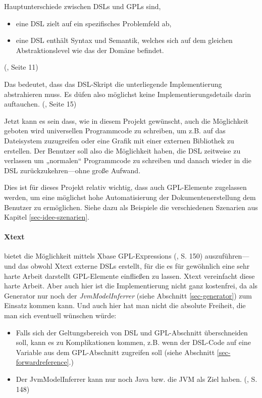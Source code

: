 Hauptunterschiede zwischen DSLs und GPLs sind,

\begin{itemize}
  \item eine DSL zielt auf ein spezifisches Problemfeld ab,
  \item eine DSL enthält Syntax und Semantik, welches sich auf dem gleichen
        Abstraktionslevel wie das der Domäne befindet.
\end{itemize}

(\cite{dsls}, Seite 11)

Das bedeutet, dass das DSL-Skript die unterliegende Implementierung abstrahieren
muss. Es düfen also möglichst keine Implementierungsdetails darin auftauchen.
(\cite{dsls}, Seite 15)

Jetzt kann es sein dass, wie in diesem Projekt gewünscht,
auch die Möglichkeit geboten wird universellen Programmcode zu schreiben,
um z.B. auf das Dateisystem zuzugreifen oder eine Grafik mit einer
externen Bibliothek zu erstellen. Der Benutzer soll also die
Möglichkeit haben, die DSL zeitweise zu verlassen um „normalen“ Programmcode
zu schreiben und danach wieder in die DSL zurückzukehren---ohne große
Aufwand.

Dies ist für dieses Projekt relativ wichtig, dass auch GPL-Elemente zugelassen
werden, um eine möglichst hohe Automatisierung der Dokumentenerstellung
dem Benutzer zu ermöglichen. Siehe dazu als Beispiele
die verschiedenen Szenarien aus Kapitel \ref{sec-idee-szenarien}.

\paragraph{Xtext} bietet die Möglichkeit mittels Xbase GPL-Expressions
(\cite{xtext}, S. 150)
auszuführen---und das obwohl Xtext externe DSLs erstellt, für die es für
gewöhnlich eine sehr harte Arbeit darstellt GPL-Elemente einfließen zu lassen.
Xtext vereinfacht diese harte Arbeit. Aber auch hier ist die Implementierung
nicht ganz kostenfrei, da als Generator nur noch der \emph{JvmModelInferrer}
(siehe Abschnitt \ref{sec-generator}) zum Einsatz kommen kann.
Und auch hier hat man nicht die absolute Freiheit, die man sich eventuell
wünschen würde:

\begin{itemize}
  \item Falls sich der Geltungsbereich von DSL und GPL-Abschnitt überschneiden
        soll, kann es zu Komplikationen kommen, z.B. wenn der DSL-Code
        auf eine Variable aus dem GPL-Abschnitt zugreifen soll (siehe
        Abschnitt \ref{sec-forwardreference}.)
  \item Der JvmModelInferrer kann nur noch Java bzw. die JVM als Ziel haben.
        (\cite{xtext}, S. 148)
\end{itemize}

